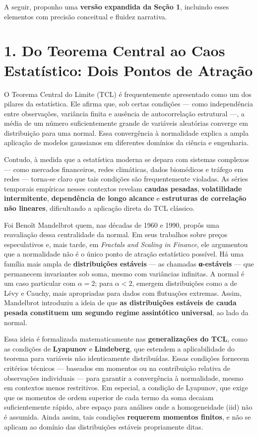 \documentclass[
]{agujournal2019}
\begin{document}
A seguir, proponho uma \textbf{versão expandida da Seção 1}, incluindo
esses elementos com precisão conceitual e fluidez narrativa.

\section{1. Do Teorema Central ao Caos Estatístico: Dois Pontos de
Atração}\label{do-teorema-central-ao-caos-estatuxedstico-dois-pontos-de-atrauxe7uxe3o}

O Teorema Central do Limite (TCL) é frequentemente apresentado como um
dos pilares da estatística. Ele afirma que, sob certas condições ---
como independência entre observações, variância finita e ausência de
autocorrelação estrutural ---, a média de um número suficientemente
grande de variáveis aleatórias converge em distribuição para uma normal.
Essa convergência à normalidade explica a ampla aplicação de modelos
gaussianos em diferentes domínios da ciência e engenharia.

Contudo, à medida que a estatística moderna se depara com sistemas
complexos --- como mercados financeiros, redes climáticas, dados
biomédicos e tráfego em redes --- torna-se claro que tais condições são
frequentemente violadas. As séries temporais empíricas nesses contextos
revelam \textbf{caudas pesadas}, \textbf{volatilidade intermitente},
\textbf{dependência de longo alcance} e \textbf{estruturas de correlação
não lineares}, dificultando a aplicação direta do TCL clássico.

Foi Benoît Mandelbrot quem, nas décadas de 1960 e 1990, propôs uma
reavaliação dessa centralidade da normal. Em seus trabalhos sobre preços
especulativos e, mais tarde, em \emph{Fractals and Scaling in Finance},
ele argumentou que a normalidade não é o único ponto de atração
estatístico possível. Há uma família mais ampla de \textbf{distribuições
estáveis} --- as chamadas \textbf{α-estáveis} --- que permanecem
invariantes sob soma, mesmo com variâncias infinitas. A normal é um caso
particular com \(\alpha = 2\); para \(\alpha < 2\), emergem
distribuições como a de Lévy e Cauchy, mais apropriadas para dados com
flutuações extremas. Assim, Mandelbrot introduziu a ideia de que
\textbf{as distribuições estáveis de cauda pesada constituem um segundo
regime assintótico universal}, ao lado da normal.

Essa ideia é formalizada matematicamente nas \textbf{generalizações do
TCL}, como as condições de \textbf{Lyapunov} e \textbf{Lindeberg}, que
estendem a aplicabilidade do teorema para variáveis não identicamente
distribuídas. Essas condições fornecem critérios técnicos --- baseados
em momentos ou na contribuição relativa de observações individuais ---
para garantir a convergência à normalidade, mesmo em contextos menos
restritivos. Em especial, a condição de Lyapunov, que exige que os
momentos de ordem superior de cada termo da soma decaiam suficientemente
rápido, abre espaço para análises onde a homogeneidade (iid) não é
assumida. Ainda assim, tais condições \textbf{requerem momentos
finitos}, e não se aplicam ao domínio das distribuições estáveis
propriamente ditas.
\end{document}
